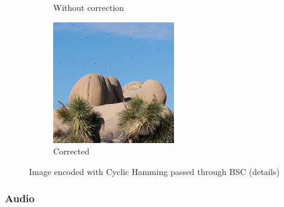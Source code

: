 \documentclass{article}
\begin{document}
\begin{figure}[htb]
\begin{subfigure}[b]{0.32\textwidth}
        \caption{Without correction}
        \label{fig:cropped-image-cyclic-bsc-no-correction}
    \end{subfigure}
    \hfill
    \begin{subfigure}[b]{0.32\textwidth}
        \centering
        \includegraphics[width=\textwidth]{../Result/cropped-cyclic-bsc-output-syndrome-corrected.png}
        \caption{Corrected}
        \label{fig:cropped-image-cyclic-bsc-syndrome-corrected}
    \end{subfigure}
       \caption{Image encoded with Cyclic Hamming passed through BSC (details)}
       \label{fig:cropped-image-cyclic-bsc}
\end{figure}






\subsubsection{Audio}
\end{document}
